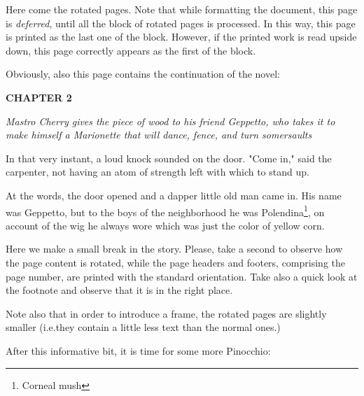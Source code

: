 \documentclass[12pt,twoside]{article}
\begin{document}
\rotboxpages%
Here come the rotated pages. Note that while formatting the
document, this page is \emph{deferred}, until all the block of rotated
pages is processed. In this way, this page is printed as the last one
of the block. However, if the printed work is read upside down, this
page correctly appears as the first of the block.

Obviously, also this page contains the continuation of the novel:

\bigskip
{\slshape%

  \textbf{CHAPTER 2}

  \emph{Mastro Cherry gives the piece of wood to his friend Geppetto,
    who takes it to make himself a Marionette that will dance,
    fence, and turn somersaults}
  \medskip

  In that very instant, a loud knock sounded on the door.
  "Come in," said the carpenter, not having an atom of
  strength left with which to stand up.

  At the words, the door opened and a dapper little old man came in.
  His name was Geppetto, but to the boys of the neighborhood he was
  Polendina\footnote{Corneal mush}, on account of the wig he always
  wore which was just the color of yellow corn.

}

\bigbreak

Here we make a small break in the story. Please, take a second to
observe how the page content is rotated, while the page headers and
footers, comprising the page number, are printed with the standard
orientation. Take also a quick look at the footnote and observe that
it is in the right place.

Note also that in order to introduce a frame, the rotated pages are
slightly smaller (i.e.\@ they contain a little less text than the
normal ones.)

After this informative bit, it is time for some more Pinocchio:
\end{document}
